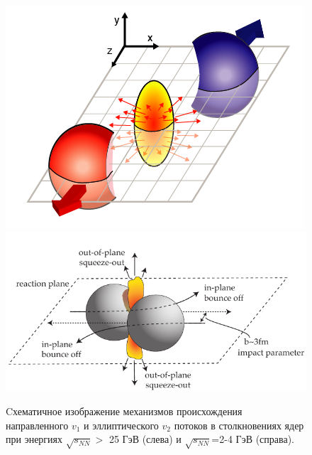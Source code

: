 \begin{figure}[h]
\begin{center}
 \includegraphics[width=0.38\linewidth]{images/illustration_1_initial_spatial_asymmetry.png}
  \includegraphics[width=0.55\linewidth]{images/flow1.png}
 \caption{ Cхематичное изображение механизмов происхождения направленного $v_1$ и эллиптического $v_2$ потоков в
  столкновениях ядер при энергиях $\sqrt{s_{NN}}>$ 25 ГэВ (слева) и $\sqrt{s_{NN}}$=2-4 ГэВ (справа).}
\label{fig:bounce_off}
\end{center}
\end{figure}

